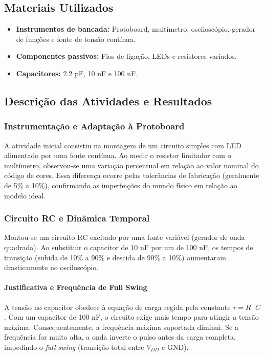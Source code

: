 \documentclass[conference]{IEEEtran}
\begin{document}
\subsection{Materiais Utilizados}
\begin{itemize}
    \item \textbf{Instrumentos de bancada:} Protoboard, multímetro, osciloscópio, gerador de funções e fonte de tensão contínua.
    \item \textbf{Componentes passivos:} Fios de ligação, LEDs e resistores variados.
    \item \textbf{Capacitores:} 2.2 pF, 10 nF e 100 nF.
\end{itemize}

\subsection{Descrição das Atividades e Resultados}

\subsubsection{Instrumentação e Adaptação à Protoboard}
A atividade inicial consistiu na montagem de um circuito simples com LED alimentado por uma fonte contínua. Ao medir o resistor limitador com o multímetro, observou-se uma variação percentual em relação ao valor nominal do código de cores. Essa diferença ocorre pelas tolerâncias de fabricação (geralmente de 5\% a 10\%), confirmando as imperfeições do mundo físico em relação ao modelo ideal.

\subsubsection{Circuito RC e Dinâmica Temporal}
Montou-se um circuito RC excitado por uma fonte variável (gerador de onda quadrada). Ao substituir o capacitor de 10 nF por um de 100 nF, os tempos de transição (subida de 10\% a 90\% e descida de 90\% a 10\%) aumentaram drasticamente no osciloscópio.

\paragraph{Justificativa e Frequência de Full Swing}
A tensão no capacitor obedece à equação de carga regida pela constante $\tau = R \cdot C$. Com um capacitor de 100 nF, o circuito exige mais tempo para atingir a tensão máxima. Consequentemente, a frequência máxima suportada diminui. Se a frequência for muito alta, a onda inverte o pulso antes da carga completa, impedindo o \textit{full swing} (transição total entre $V_{DD}$ e GND).
\end{document}
